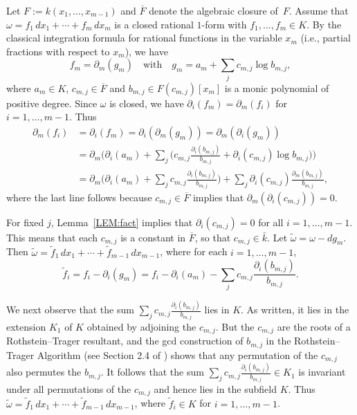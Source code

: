 \documentclass{amsart}
\theoremstyle{definition}
\numberwithin{equation}{section}
\numberwithin{thm}{section}
\begin{document}
 Let $F := k(x_1, \ldots, x_{m-1})$ and $\overline{F}$ denote the algebraic closure of~$F$. Assume that $\omega = f_1\, dx_1 + \cdots + f_m\, dx_m$ is a closed rational $1$-form with $f_1,\dots,f_m \in K$.
By the classical integration formula for rational functions in the variable $x_m$ (i.e., partial fractions with respect to $x_m$), we have
\begin{equation}\label{EQ:fm}
f_m = \partial_{m}(g_m)\quad  \text{with}\quad  g_m = a_{m} + \sum_j c_{m, j} \log b_{m, j},
\end{equation}
where  $a_{m} \in K$, $c_{m, j} \in \overline{F}$ and $b_{m, j} \in F(c_{m, j})[x_m]$ is a monic polynomial of positive degree.
Since $\omega$ is closed, we have $\partial_i(f_m) = \partial_m(f_i)$ for~$i=1, \ldots, m-1$. Thus
\begin{equation}\label{EQ:partialfm} 
\begin{aligned}
 \partial_m(f_i) &= \partial_i(f_m) = \partial_i(\partial_m(g_m))= \partial_m(\partial_i(g_m))\\
  &= \partial_m\bigg(\partial_i(a_m) + \sum_j \Big(c_{m, j}\frac{\partial_i(b_{m, j})}{b_{m, j}} + \partial_i(c_{m, j}) \log b_{m, j}\Big)\!\bigg) \\
 &= \partial_m\bigg(\partial_i(a_m) + \sum_j c_{m, j} \frac{\partial_i(b_{m, j})}{b_{m, j}} \bigg) + \sum_j \partial_i(c_{m, j})\frac{\partial_m(b_{m, j})}{b_{m, j}},
\end{aligned}
\end{equation}
where the last line follows because $c_{m, j} \in \overline{F}$ implies that $\partial_m(\partial_i(c_{m, j})) = 0$.

For fixed $j$, Lemma~\ref{LEM:fact} implies that $\partial_i(c_{m, j}) = 0$ for all $i=1, \ldots, m-1$. This means that each $c_{m, j}$ is a constant in $\overline{F}$, so that $c_{m,j} \in \bar k$. Let $\widetilde{\omega} = \omega - dg_m$. Then $\widetilde{\omega} = \tilde{f}_1 \,dx_1 + \cdots + \tilde{f}_{m-1}\,dx_{m-1}$, where for each $i=1, \ldots, m-1$,
\begin{equation*}%
\tilde{f}_i = f_i - \partial_i(g_m) = f_i -\partial_i(a_m) - \sum_j c_{m, j} \frac{\partial_i(b_{m, j})}{b_{m, j}}.
\end{equation*}

We next observe that the sum $\sum_j c_{m, j} \frac{\partial_i(b_{m, j})}{b_{m, j}}$  lies in $K$.  As written, it lies in the extension $K_1$ of $K$ obtained by adjoining the $c_{m,j}$.  But the $c_{m,j}$ are the roots of a Rothstein--Trager resultant, and the gcd construction of $b_{m,j}$ in the Rothstein--Trager Algorithm (see Section 2.4 of \cite{Bronstein}) shows that any permutation of the $c_{m,j}$ also permutes the $b_{m,j}$.  It follows that the sum $\sum_j c_{m, j} \frac{\partial_i(b_{m, j})}{b_{m, j}} \in K_1$ is invariant under all permutations of the $c_{m,j}$ and hence lies in the subfield $K$.  Thus $\widetilde{\omega} = \tilde{f}_1 \,dx_1 + \cdots + \tilde{f}_{m-1}\,dx_{m-1}$, where $\tilde{f}_i \in K$ for $i=1, \ldots, m-1$.
\end{document}
